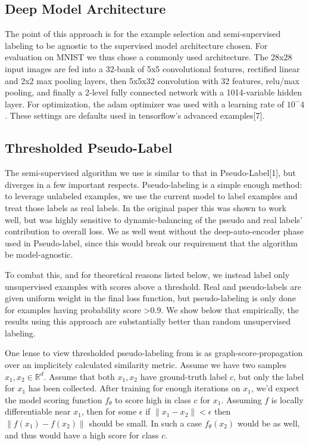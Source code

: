 \documentclass{article}
\begin{document}
\subsection{Deep Model Architecture}
The point of this approach is for the example selection and semi-supervised labeling to be agnostic to the supervised model architecture chosen.  For evaluation on MNIST we thus chose a commonly used architecture.  The 28x28 input images are fed into a 32-bank of 5x5 convolutional features, rectified linear and 2x2 max pooling layers, then 5x5x32 convolution with 32 features, relu/max pooling, and finally a 2-level fully connected network with a 1014-variable hidden layer.  For optimization, the adam optimizer was used with a learning rate of $10^-4$.  These settings are defaults used in tensorflow's advanced examples[7].

\subsection{Thresholded Pseudo-Label}
The semi-supervised algorithm we use is similar to that in Pseudo-Label[1], but diverges in a few important respects.  Pseudo-labeling is a simple enough method: to leverage unlabeled examples, we use the current model to label examples and treat those labels as real labels.  In the original paper this was shown to work well, but was highly sensitive to dynamic-balancing of the pseudo and real labels' contribution to overall loss.  We as well went without the deep-auto-encoder phase used in Pseudo-label, since this would break our requirement that the algorithm be model-agnostic.  

To combat this, and for theoretical reasons listed below, we instead label only unsupervised examples with scores above a threshold.  Real and pseudo-labels are given uniform weight in the final loss function, but pseudo-labeling is only done for examples having probability score >0.9.  We show below that empirically, the results using this approach are substantially better than random unsupervised labeling.  

One lense to view thresholded pseudo-labeling from is as graph-score-propagation over an implicitely calculated similarity metric.  Assume we have two samples $x_1,x_2 \in \mathbb{R}^d$.  Assume that both $x_1,x_2$ have ground-truth label $c$, but only the label for $x_1$ has been collected.  After training for enough iterations on $x_1$, we'd expect the model scoring function $f_{\theta}$ to score high in class $c$ for $x_1$.  Assuming $f$ is locally differentiable near $x_1$, then for some $\epsilon$ if $\|x_1-x_2\|<\epsilon$ then $\|f(x_1)-f(x_2)\|$ should be small.  In such a case $f_{\theta}(x_2)$ would be as well, and thus would have a high score for class $c$.  
\end{document}
